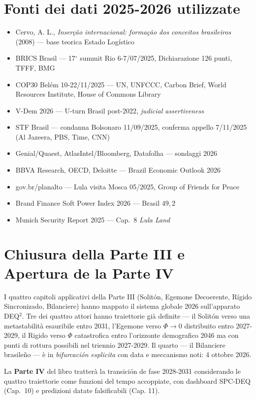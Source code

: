 \section{Fonti dei dati 2025-2026
utilizzate}\label{fonti-dei-dati-2025-2026-utilizzate}

\begin{itemize}
\tightlist
\item
  Cervo, A. L., \emph{Inserção internacional: formação dos conceitos
  brasileiros} (2008) --- base teorica Estado Logístico
\item
  BRICS Brasil --- 17$^\circ$ summit Rio 6-7/07/2025, Dichiarazione 126 punti,
  TFFF, BMG
\item
  COP30 Belém 10-22/11/2025 --- UN, UNFCCC, Carbon Brief, World
  Resources Institute, House of Commons Library
\item
  V-Dem 2026 --- U-turn Brasil post-2022, \emph{judicial assertiveness}
\item
  STF Brasil --- condanna Bolsonaro 11/09/2025, conferma appello
  7/11/2025 (Al Jazeera, PBS, Time, CNN)
\item
  Genial/Quaest, AtlasIntel/Bloomberg, Datafolha --- sondaggi 2026
\item
  BBVA Research, OECD, Deloitte --- Brazil Economic Outlook 2026
\item
  gov.br/planalto --- Lula visita Mosca 05/2025, Group of Friends for
  Peace
\item
  Brand Finance Soft Power Index 2026 --- Brasil \(49{,}2\)
\item
  Munich Security Report 2025 --- Cap.~8 \emph{Lula Land}
\end{itemize}



\section{Chiusura della Parte III e Apertura de la Parte
IV}\label{chiusura-della-parte-iii-e-apertura-della-parte-iv}

I quattro capitoli applicativi della Parte III (Solitón, Egemone
Decoerente, Rígido Sincronizado, Bilanciere) hanno mappato il sistema
globale 2026 sull'apparato DEQ$^2$. Tre dei quattro attori hanno
traiettorie già definite --- il Solitón verso una metastabilità
esauribile entro 2031, l'Egemone verso \(\Phi \to 0\) distribuito entro
2027-2029, il Rigido verso \(\Phi\) catastrofica entro l'orizzonte
demografico 2046 ma con punti di rottura possibili nel triennio
2027-2029. Il quarto --- il Bilanciere brasileño --- è in
\emph{bifurcación esplicita} con data e meccanismo noti: 4 ottobre
2026.

La \textbf{Parte IV} del libro tratterà la transición de fase 2028-2031
considerando le quattro traiettorie come funzioni del tempo accoppiate,
con dashboard SPC-DEQ (Cap.~10) e predizioni datate falsificabili (Cap.
11).


